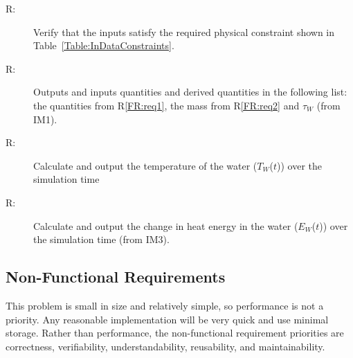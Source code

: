 \documentclass[12pt]{article}
\newcounter{reqnum}
\newcommand{\rthereqnum}{R\thereqnum}
\begin{document}
\begin{description}
\item[\rthereqnum\label{FR:req3}:]Verify that the inputs satisfy the required physical constraint shown in Table~\ref{Table:InDataConstraints}.
\end{description}
\begin{description}
\item[\rthereqnum\label{FR:req4}:]Outputs and inputs quantities and derived quantities in the following list: the quantities from R\ref{FR:req1}, the mass from R\ref{FR:req2} and ${τ_{W}}$ (from IM1).
\end{description}
\begin{description}
\item[\rthereqnum\label{FR:req5}:]Calculate and output the temperature of the water (${T_{W}}$($t$)) over the simulation time
\end{description}
\begin{description}
\item[\rthereqnum\label{FR:req6}:]Calculate and output the change in heat energy in the water (${E_{W}}$($t$)) over the simulation time (from IM3).
\end{description}
\subsection{Non-Functional Requirements}
\label{Sec:NFRs}
This problem is small in size and relatively simple, so performance is not a priority. Any reasonable implementation will be very quick and use minimal storage. Rather than performance, the non-functional requirement priorities are correctness, verifiability, understandability, reusability, and maintainability.
\end{document}
